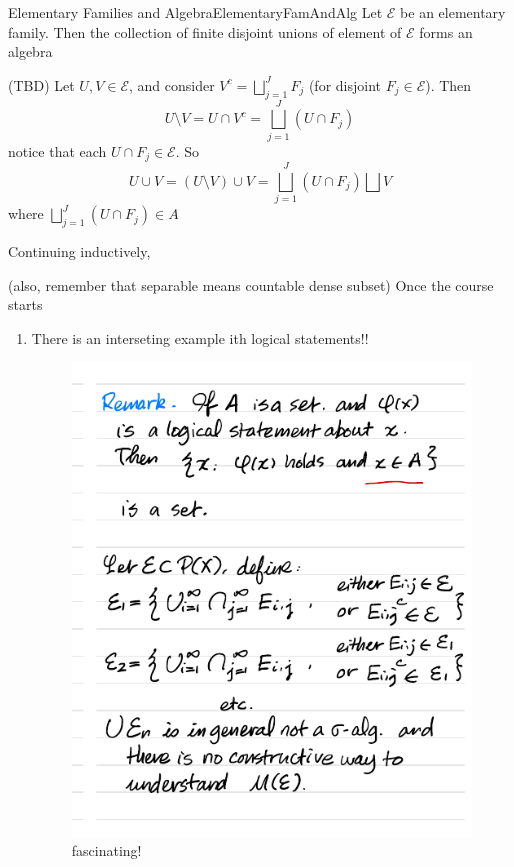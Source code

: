 \documentclass[oneside]{book}
\newcommand{\dcup}{\bigsqcup}
\newcommand{\CE}{\mathcal{E}}
\begin{document}
\begin{prop}{Elementary Families and Algebra}{ElementaryFamAndAlg}
	Let $\CE$ be an elementary family. Then the collection of finite disjoint unions of element of $\CE$ forms an
	algebra
\end{prop}

\begin{Proof}
	(TBD)
	Let $U, V \in \CE$, and consider $V^c = \dcup_{j=1}^J F_j$ (for disjoint $F_j \in \CE$). Then 
	\[
		U\setminus V = U\cap V^c = \dcup_{j=1}^J (U \cap F_j)
	\]
	notice that each $U\cap F_j \in \CE$. So
	\[
		U\cup V = (U\setminus V)\cup V = \dcup_{j=1}^J (U\cap F_j) \dcup V
	\]
	where $\dcup_{j=1}^J (U\cap F_j) \in A$

	Continuing inductively, 
\end{Proof}



(also, remember that separable means countable dense subset)
Once the course starts
\begin{enumerate}
	\item There is an interseting example ith logical statements!!
		\begin{figure}[H] 
		  \centering
		  \includegraphics{fig_notSigmaAlgebraLogicEx}
		  \caption{fascinating!}
		\end{figure}
\end{enumerate}
\end{document}
